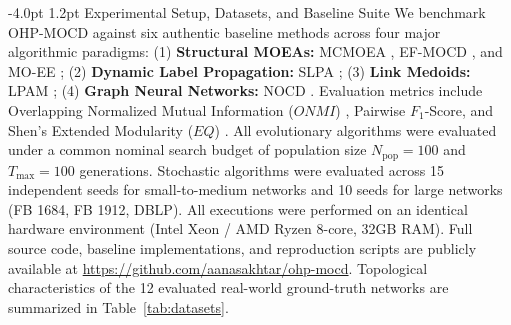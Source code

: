 \documentclass{svproc}
\makeatletter
\renewcommand\subsection{\@startsection{subsection}{2}{\z@}%
  {-4.0pt \@plus -0.5pt \@minus -0.5pt}%
  {1.2pt \@plus 0.5pt}%
  {\normalfont\normalsize\bfseries\boldmath}}
\makeatother
\begin{document}
\subsection{Experimental Setup, Datasets, and Baseline Suite}\label{subsec:setup}
We benchmark OHP-MOCD against six authentic baseline methods across four major algorithmic paradigms: (1) \textbf{Structural MOEAs:} MCMOEA \cite{wen2016}, EF-MOCD \cite{tian2020}, and MO-EE \cite{bello2018}; (2) \textbf{Dynamic Label Propagation:} SLPA \cite{xie2011}; (3) \textbf{Link Medoids:} LPAM \cite{ponomarenko2021}; (4) \textbf{Graph Neural Networks:} NOCD \cite{shchur2019}. Evaluation metrics include Overlapping Normalized Mutual Information ($ONMI$) \cite{lancichinetti2009onmi}, Pairwise $F_1$-Score, and Shen's Extended Modularity ($EQ$) \cite{shen2009,nicosia2009}. All evolutionary algorithms were evaluated under a common nominal search budget of population size $N_{\text{pop}} = 100$ and $T_{\text{max}} = 100$ generations. Stochastic algorithms were evaluated across 15 independent seeds for small-to-medium networks and 10 seeds for large networks (FB 1684, FB 1912, DBLP). All executions were performed on an identical hardware environment (Intel Xeon / AMD Ryzen 8-core, 32GB RAM). Full source code, baseline implementations, and reproduction scripts are publicly available at \url{https://github.com/aanasakhtar/ohp-mocd}. Topological characteristics of the 12 evaluated real-world ground-truth networks are summarized in Table~\ref{tab:datasets}.
\end{document}
